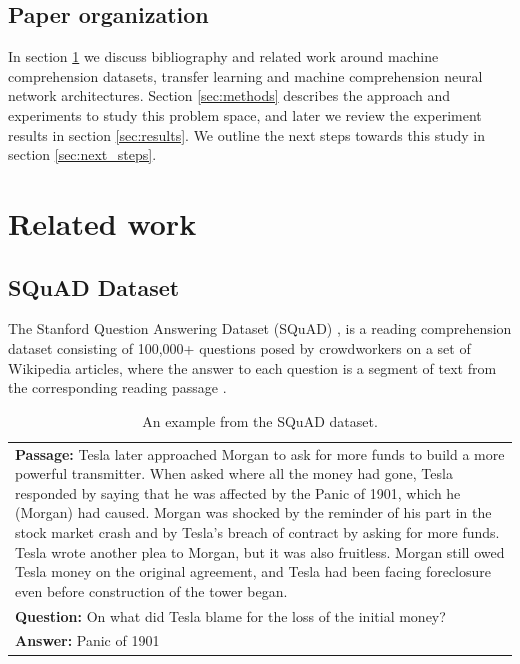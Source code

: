 \documentclass[11pt,a4paper]{article}
\begin{document}
\subsection{Paper organization}

In section \ref{sec:related_work} we discuss bibliography and related work around machine comprehension datasets, transfer learning and machine comprehension neural network architectures. Section \ref{sec:methods} describes the approach and experiments to study this problem space, and later we review the experiment results in section \ref{sec:results}. We outline the next steps towards this study in section \ref{sec:next_steps}.  


\section{Related work}
\label{sec:related_work}


\subsection{SQuAD Dataset}
\label{ssec:squad}

The Stanford Question Answering Dataset (SQuAD) \cite{rnet}, is a reading comprehension dataset consisting of 100,000+ questions posed by crowdworkers on a set of
Wikipedia articles, where the answer to each question is a segment of text from the corresponding reading passage \cite{squad:2016}.

\begin{table}
\centering
\begin{tabular}{|p{7cm}|}
 \hline
\textbf{Passage:} Tesla later approached Morgan to ask for more funds to build a more powerful transmitter. When asked where all the money had gone, Tesla responded by saying that he was affected by the Panic of 1901, which he (Morgan) had caused. Morgan was shocked by the reminder of his part in the stock market crash and by Tesla’s breach of contract by asking for more funds. Tesla wrote another plea to Morgan, but it was also fruitless. Morgan still owed Tesla money on the original agreement, and Tesla had been facing foreclosure even before construction of the tower began.\\ 
\textbf{Question:} On what did Tesla blame for the loss of the initial money?\\
\textbf{Answer:} Panic of 1901\\
 \hline
\end{tabular}
\caption{An example from the SQuAD dataset.
  }
\end{table}
\end{document}
